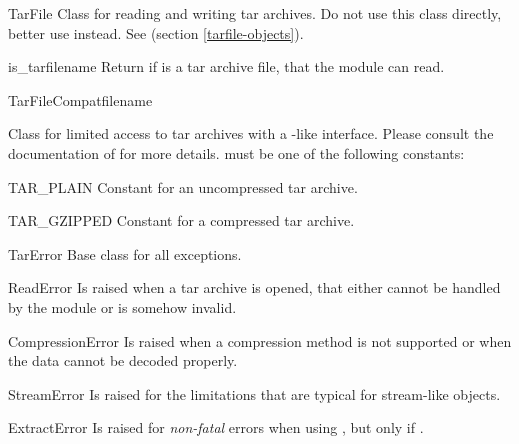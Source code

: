 \begin{classdesc*}{TarFile}
    Class for reading and writing tar archives. Do not use this
    class directly, better use  instead.
    See  (section \ref{tarfile-objects}).
\end{classdesc*}

\begin{funcdesc}{is_tarfile}{name}
    Return  if  is a tar archive file, that the
     module can read.
\end{funcdesc}

\begin{classdesc}{TarFileCompat}{filename}

    Class for limited access to tar archives with a -like
    interface. Please consult the documentation of  for more
    details.
     must be one of the following constants:
    \begin{datadesc}{TAR_PLAIN}
        Constant for an uncompressed tar archive.
    \end{datadesc}
    \begin{datadesc}{TAR_GZIPPED}
        Constant for a  compressed tar archive.
    \end{datadesc}
\end{classdesc}

\begin{excdesc}{TarError}
    Base class for all  exceptions.
\end{excdesc}

\begin{excdesc}{ReadError}
    Is raised when a tar archive is opened, that either cannot be handled by
    the  module or is somehow invalid.
\end{excdesc}

\begin{excdesc}{CompressionError}
    Is raised when a compression method is not supported or when the data
    cannot be decoded properly.
\end{excdesc}

\begin{excdesc}{StreamError}
    Is raised for the limitations that are typical for stream-like
     objects.
\end{excdesc}

\begin{excdesc}{ExtractError}
    Is raised for \emph{non-fatal} errors when using , but
    only if .
\end{excdesc}

